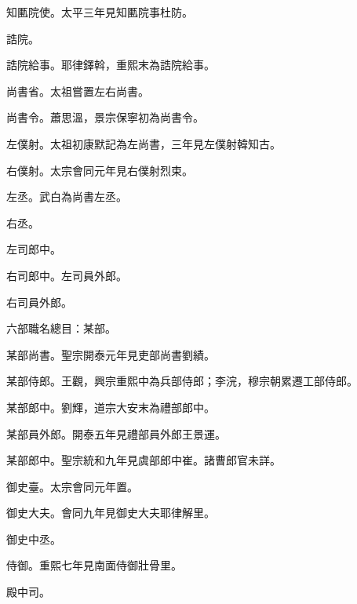 \begin{pinyinscope}
 知匭院使。太平三年見知匭院事杜防。



 誥院。



 誥院給事。耶律鐸斡，重熙末為誥院給事。



 尚書省。太祖嘗置左右尚書。



 尚書令。蕭思溫，景宗保寧初為尚書令。



 左僕射。太祖初康默記為左尚書，三年見左僕射韓知古。



 右僕射。太宗會同元年見右僕射烈束。



 左丞。武白為尚書左丞。



 右丞。



 左司郎中。



 右司郎中。左司員外郎。



 右司員外郎。



 六部職名總目：某部。



 某部尚書。聖宗開泰元年見吏部尚書劉績。



 某部侍郎。王觀，興宗重熙中為兵部侍郎；李浣，穆宗朝累遷工部侍郎。



 某部郎中。劉輝，道宗大安末為禮部郎中。



 某部員外郎。開泰五年見禮部員外郎王景運。



 某部郎中。聖宗統和九年見虞部郎中崔。諸曹郎官未詳。



 御史臺。太宗會同元年置。



 御史大夫。會同九年見御史大夫耶律解里。



 御史中丞。



 侍御。重熙七年見南面侍御壯骨里。



 殿中司。




\end{pinyinscope}
